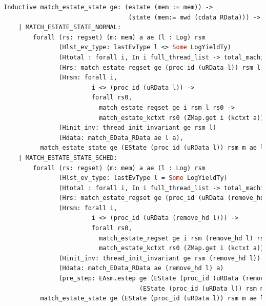 \begin{lstlisting}[language=Caml]
    Inductive match_estate_state ge: (estate (mem := mem)) -> 
                                  (state (mem:= mwd (cdata RData))) -> Prop :=
    | MATCH_ESTATE_STATE_NORMAL:
        forall (rs: regset) (m: mem) a ae (l : Log) rsm
               (Hlst_ev_type: lastEvType l <> Some LogYieldTy)
               (Htotal : forall i, In i full_thread_list -> total_machine_regset i rsm)
               (Hrs: match_estate_regset ge (proc_id (uRData l)) rsm l rs) (* my regset *)
               (Hrsm: forall i,
                        i <> (proc_id (uRData l)) ->
                        forall rs0,
                          match_estate_regset ge i rsm l rs0 ->
                          match_estate_kctxt rs0 (ZMap.get i (kctxt a))) (* others' regset will be remained as same *)
               (Hinit_inv: thread_init_invariant ge rsm l)
               (Hdata: match_EData_RData ae l a), 
          match_estate_state ge (EState (proc_id (uRData l)) rsm m ae l) (State rs (m, a))
    | MATCH_ESTATE_STATE_SCHED:
        forall (rs: regset) (m: mem) a ae (l : Log) rsm
               (Hlst_ev_type: lastEvType l = Some LogYieldTy)
               (Htotal : forall i, In i full_thread_list -> total_machine_regset i rsm)
               (Hrs: match_estate_regset ge (proc_id (uRData (remove_hd l))) rsm (remove_hd l) rs) (* my regset *)
               (Hrsm: forall i,
                        i <> (proc_id (uRData (remove_hd l))) ->
                        forall rs0,
                          match_estate_regset ge i rsm (remove_hd l) rs0 ->
                          match_estate_kctxt rs0 (ZMap.get i (kctxt a))) (* others' regset will be remained as same *)
               (Hinit_inv: thread_init_invariant ge rsm (remove_hd l))
               (Hdata: match_EData_RData ae (remove_hd l) a)
               (pre_step: EAsm.estep ge (EState (proc_id (uRData (remove_hd l))) rsm m ae (remove_hd l)) E0
                                     (EState (proc_id (uRData l)) rsm m ae l)),
          match_estate_state ge (EState (proc_id (uRData l)) rsm m ae l) (State rs (m, a)).
\end{lstlisting}

